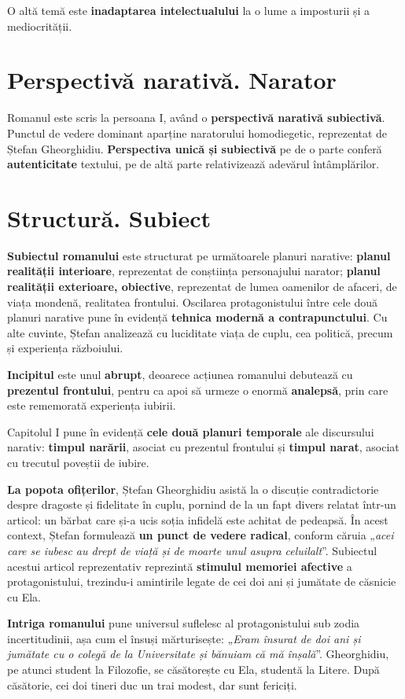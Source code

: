 \documentclass{article}
\newcommand{\qu}[1]{„\emph{#1}”}
\begin{document}
O altă temă este \textbf{inadaptarea intelectualului} la o lume a imposturii și a mediocrității.
\section{Perspectivă narativă. Narator}
Romanul este scris la persoana I, având o \textbf{perspectivă narativă subiectivă}. Punctul de vedere dominant aparține naratorului homodiegetic, reprezentat de Ștefan Gheorghidiu. \textbf{Perspectiva unică și subiectivă} pe de o parte conferă \textbf{autenticitate} textului, pe de altă parte relativizează adevărul întâmplărilor.
\section{Structură. Subiect}
\textbf{Subiectul romanului} este structurat pe următoarele planuri narative: \textbf{planul realității interioare}, reprezentat de conștiința personajului narator; \textbf{planul realității exterioare, obiective}, reprezentat de lumea oamenilor de afaceri, de viața mondenă, realitatea frontului. Oscilarea protagonistului între cele două planuri narative pune în evidență \textbf{tehnica modernă a contrapunctului}. Cu alte cuvinte, Ștefan analizează cu luciditate viața de cuplu, cea politică, precum și experiența războiului.

\textbf{Incipitul} este unul \textbf{abrupt}, deoarece acțiunea romanului debutează cu \textbf{prezentul frontului}, pentru ca apoi să urmeze o enormă \textbf{analepsă}, prin care este rememorată experiența iubirii.

Capitolul I pune în evidență \textbf{cele două planuri temporale} ale discursului narativ: \textbf{timpul narării}, asociat cu prezentul frontului și \textbf{timpul narat}, asociat cu trecutul poveștii de iubire.

\textbf{La popota ofițerilor}, Ștefan Gheorghidiu asistă la o discuție contradictorie despre dragoste și fidelitate în cuplu, pornind de la un fapt divers relatat într-un articol: un bărbat care și-a ucis soția infidelă este achitat de pedeapsă. În acest context, Ștefan formulează \textbf{un punct de vedere radical}, conform căruia \qu{acei care se iubesc au drept de viață și de moarte unul asupra celuilalt}. Subiectul acestui articol reprezentativ reprezintă \textbf{stimulul memoriei afective} a protagonistului, trezindu-i amintirile legate de cei doi ani și jumătate de căsnicie cu Ela.

\textbf{Intriga romanului} pune universul suflelesc al protagonistului sub zodia incertitudinii, așa cum el însuși mărturisește: \qu{Eram însurat de doi ani și jumătate cu o colegă de la Universitate și bănuiam că mă înșală}. Gheorghidiu, pe atunci student la Filozofie, se căsătorește cu Ela, studentă la Litere. După căsătorie, cei doi tineri duc un trai modest, dar sunt fericiți.
\end{document}
